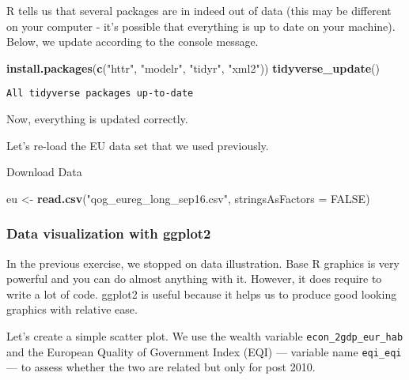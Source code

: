 \documentclass[]{article}
\newenvironment{Shaded}{\begin{snugshade}}{\end{snugshade}}
\newcommand{\DataTypeTok}[1]{\textcolor[rgb]{0.13,0.29,0.53}{#1}}
\newcommand{\KeywordTok}[1]{\textcolor[rgb]{0.13,0.29,0.53}{\textbf{#1}}}
\newcommand{\NormalTok}[1]{#1}
\newcommand{\OtherTok}[1]{\textcolor[rgb]{0.56,0.35,0.01}{#1}}
\newcommand{\StringTok}[1]{\textcolor[rgb]{0.31,0.60,0.02}{#1}}
\begin{document}
R tells us that several packages are in indeed out of data (this may be different on your computer - it's possible that everything is up to date on your machine). Below, we update according to the console message.

\begin{Shaded}
\begin{Highlighting}[]
\KeywordTok{install.packages}\NormalTok{(}\KeywordTok{c}\NormalTok{(}\StringTok{"httr"}\NormalTok{, }\StringTok{"modelr"}\NormalTok{, }\StringTok{"tidyr"}\NormalTok{, }\StringTok{"xml2"}\NormalTok{))}
\KeywordTok{tidyverse_update}\NormalTok{()}
\end{Highlighting}
\end{Shaded}

\begin{verbatim}
All tidyverse packages up-to-date
\end{verbatim}

Now, everything is updated correctly.

Let's re-load the EU data set that we used previously.

Download Data

\begin{Shaded}
\begin{Highlighting}[]
\NormalTok{eu <-}\StringTok{ }\KeywordTok{read.csv}\NormalTok{(}\StringTok{"qog_eureg_long_sep16.csv"}\NormalTok{, }\DataTypeTok{stringsAsFactors =} \OtherTok{FALSE}\NormalTok{)}
\end{Highlighting}
\end{Shaded}

\hypertarget{data-visualization-with-ggplot2}{%
\subsubsection{Data visualization with ggplot2}\label{data-visualization-with-ggplot2}}

In the previous exercise, we stopped on data illustration. Base R graphics is very powerful and you can do almost anything with it. However, it does require to write a lot of code. ggplot2 is useful because it helps us to produce good looking graphics with relative ease.

Let's create a simple scatter plot. We use the wealth variable \texttt{econ\_2gdp\_eur\_hab} and the European Quality of Government Index (EQI) --- variable name \texttt{eqi\_eqi} --- to assess whether the two are related but only for post 2010.
\end{document}
